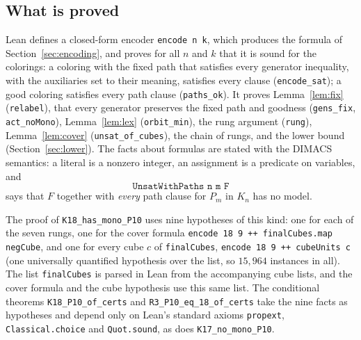 \subsection{What is proved}
Lean defines a closed-form encoder \texttt{encode n k}, which produces
the formula of Section~\ref{sec:encoding}, and proves for all $n$ and $k$
that it is sound for the colorings: a coloring with the fixed path
that satisfies every generator inequality, with the auxiliaries set to
their meaning, satisfies every clause (\texttt{encode\_sat}); a good
coloring satisfies every path clause (\texttt{paths\_ok}). It proves
Lemma~\ref{lem:fix} (\texttt{relabel}), that every generator preserves the
fixed path and goodness (\texttt{gens\_fix}, \texttt{act\_noMono}),
Lemma~\ref{lem:lex} (\texttt{orbit\_min}), the rung argument
(\texttt{rung}), Lemma~\ref{lem:cover} (\texttt{unsat\_of\_cubes}), the
chain of rungs, and the lower bound (Section~\ref{sec:lower}). The facts
about formulas are stated with the DIMACS semantics: a literal is a nonzero
integer, an assignment is a predicate on variables, and
\[
\texttt{UnsatWithPaths n m F}
\]
says that $F$ together with \emph{every} path clause for $P_m$ in $K_n$
has no model.

The proof of \texttt{K18\_has\_mono\_P10} uses nine hypotheses of this
kind: one for each of the seven rungs, one for the cover formula
\texttt{encode 18 9 ++ finalCubes.map negCube}, and one for every cube $c$
of \texttt{finalCubes}, \texttt{encode 18 9 ++ cubeUnits c} (one
universally quantified hypothesis over the list, so $15{,}964$ instances
in all). The list \texttt{finalCubes} is parsed in Lean from the
accompanying cube lists, and the cover formula and the cube hypothesis
use this same list.
The conditional theorems \texttt{K18\_P10\_of\_certs} and
\texttt{R3\_P10\_eq\_18\_of\_certs} take the nine facts as hypotheses and
depend only on Lean's standard axioms \texttt{propext},
\texttt{Classical.choice} and \texttt{Quot.sound}, as does
\texttt{K17\_no\_mono\_P10}.

